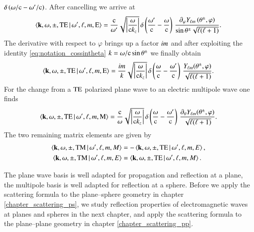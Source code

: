 $\delta\left(\omega/\mathrm{c}-\omega^\prime/\mathrm{c}\right)$. After cancelling we arrive at
\begin{equation}
\braket{{\mathbf{k}},\omega,\pm,\mathrm{TE} \, |\, \omega^\prime,\ell,m,\text{E}} 
= \frac{\mathrm{c}}{\omega^\prime} \sqrt{\left|\frac{\omega}{\mathrm{c} k_z}\right|} \, \delta\left(\frac{\omega^\prime}{\mathrm{c}}-\frac{\omega}{\mathrm{c}}\right) \, \frac{\partial_\varphi Y_{\ell m}\left(\theta^\pm,\varphi\right)}{\sin\theta^\pm \sqrt{\ell(\ell+1)}}.
\end{equation}
The derivative with respect to $\varphi$ brings up a factor $i m$ and
after exploiting the identity \eqref{eq:notation_cossintheta} $k = \omega/\mathrm{c} \sin\theta^\pm$ we finally
obtain
\begin{equation}
\label{eq:basis_change_1}
\braket{{\mathbf{k}},\omega,\pm,\mathrm{TE} \, |\, \omega^\prime,\ell,m,\text{E}} 
= \frac{i m}{k} \sqrt{\left|\frac{\omega}{\mathrm{c} k_z}\right|} \, \delta\left(\frac{\omega}{\mathrm{c}}-\frac{\omega^\prime}{\mathrm{c}}\right) \, \frac{Y_{\ell m}(\theta^\pm,\varphi)}{\sqrt{\ell(\ell+1)}}.
\end{equation}
For the change from a $\mathrm{TE}$ polarized plane wave to an electric multipole wave
one finds
\begin{equation}
\label{eq:basis_change_2}
\braket{{\mathbf{k}},\omega,\pm,\mathrm{TE} \, | \, \omega^\prime,\ell,m,\text{M}}
= \frac{\mathrm{c}}{\omega} \sqrt{\left| \frac{\omega}{\mathrm{c} k_z} \right|} \, \delta\left(\frac{\omega}{\mathrm{c}}-\frac{\omega^\prime}{\mathrm{c}}\right) \, \frac{\partial_\theta Y_{\ell m}(\theta^\pm,\varphi)}{\sqrt{\ell(\ell+1)}}.
\end{equation}
The two remaining matrix elements are given by
\begin{align}
\label{eq:basis_change_3}
\braket{{\mathbf{k}},\omega,\pm,\mathrm{TM} \, | \, \omega^\prime, \ell, m, M} &= -\braket{{\mathbf{k}},\omega,\pm,\mathrm{TE} \, | \, \omega^\prime, \ell, m, E}, \\
\label{eq:basis_change_4}
\braket{{\mathbf{k}},\omega,\pm,\mathrm{TM} \, | \, \omega^\prime, \ell, m, E} &= \braket{{\mathbf{k}},\omega,\pm,\mathrm{TE} \, | \, \omega^\prime, \ell, m, M}.
\end{align}

The plane wave basis is well adapted for propagation and reflection at a plane,
the multipole basis is well adapted for reflection at a sphere. Before we apply
the scattering formula to the plane--sphere geometry in chapter
\ref{chapter_scattering_ps}, we study reflection properties of electromagnetic
waves at planes and spheres in the next chapter, and apply the scattering
formula to the plane--plane geometry in chapter \ref{chapter_scattering_pp}.
